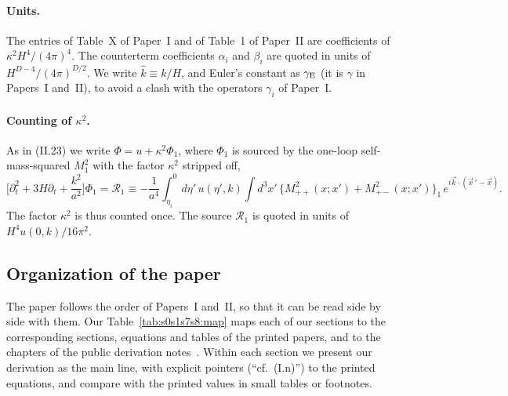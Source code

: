 \documentclass[aps,prd,onecolumn,10pt,nofootinbib,floatfix]{revtex4-2}
\newcommand{\eqI}[1]{(I.#1)}
\newcommand{\eqII}[1]{(II.#1)}
\begin{document}
\paragraph*{Units.}
The entries of Table~X of Paper~I and of Table~1 of Paper~II are coefficients of $\kappa^2H^4/(4\pi)^4$. The counterterm coefficients
$\alpha_i$ and $\beta_i$ are quoted in units of $H^{D-4}/(4\pi)^{D/2}$. We write $\hat k\equiv k/H$, and Euler's constant as
$\gamma_{\rm E}$ (it is $\gamma$ in Papers~I and~II), to avoid a clash with the operators $\gamma_i$ of Paper~I.

\paragraph*{Counting of $\kappa^2$.}
As in \eqII{23} we write $\Phi=u+\kappa^2\Phi_1$, where $\Phi_1$ is sourced by the one-loop self-mass-squared $M_1^2$ with the factor
$\kappa^2$ stripped off,
\begin{equation}
\Big[\partial_t^2+3H\partial_t+\frac{k^2}{a^2}\Big]\Phi_1=\mathcal R_1\equiv-\frac1{a^4}\int_{\eta_i}^0\!d\eta'\,u(\eta',k)
\int\!d^3x'\,\big\{M^2_{++}(x;x')+M^2_{+-}(x;x')\big\}_1\,e^{i\vec k\cdot(\vec x\,'-\vec x)} .
\label{eq:s0s1s7s8:mode}
\end{equation}
The factor $\kappa^2$ is thus counted once. The source $\mathcal R_1$ is quoted in units of $H^4u(0,k)/16\pi^2$.

\subsection{Organization of the paper}

The paper follows the order of Papers~I and~II, so that it can be read side by side with them. Our Table~\ref{tab:s0s1s7s8:map} maps each
of our sections to the corresponding sections, equations and tables of the printed papers, and to the chapters of the public
derivation notes~\cite{ref:repo}. Within each section we present our derivation as the main line, with explicit pointers (``cf.\
\eqI{n}'') to the printed equations, and compare with the printed values in small tables or footnotes.
\end{document}
